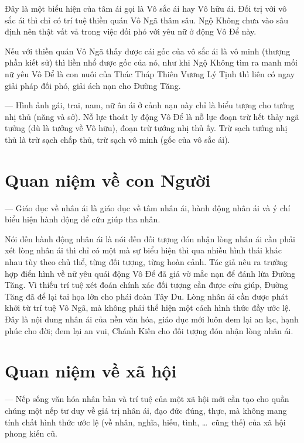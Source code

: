 Đây là một biểu hiện của tâm ái gọi là Vô sắc ái hay Vô hữu ái. Đối trị với vô sắc ái thì chỉ có trí tuệ thiền quán Vô Ngã thâm sâu. Ngộ Không chưa vào sâu định nên thật vất vả trong việc đối phó với yêu nữ ở động Vô Để này.

Nếu với thiền quán Vô Ngã thấy được cái gốc của vô sắc ái là vô minh (thượng phần kiết sử) thì liền nhổ được gốc của nó, như khi Ngộ Không tìm ra manh mối nữ yêu Vô Để là con nuôi của Thác Tháp Thiên Vương Lý Tịnh thì liên có ngay giải pháp đối phó, giải ách nạn cho Đường Tăng.

— Hình ảnh gái, trai, nam, nữ ân ái ở cảnh nạn này chỉ là biểu tượng cho tướng nhị thủ (năng và sở). Nỗ lực thoát ly động Vô Để là nỗ lực đoạn trừ hết thảy ngã tưởng (dù là tưởng về Vô hữu), đoạn trừ tướng nhị thủ ấy. Trừ sạch tướng nhị thủ là trừ sạch chấp thủ, trừ sạch vô minh (gốc của vô sắc ái).

\section{Quan niệm về con Người} %
\label{sec:80_81_con_nguoi}

— Giáo dục về nhân ái là giáo dục về tâm nhân ái, hành động nhân ái và ý chí biểu hiện hành động để cứu giúp tha nhân.

Nói đến hành động nhân ái là nói đến đối tượng đón nhận lòng nhân ái cần phải xét lòng nhân ái thì chỉ có một mà sự biểu hiện thì qua nhiều hình thái khác nhau tùy theo chủ thể, từng đối tượng, từng hoàn cảnh. Tác giả nêu ra trường hợp điển hình về nữ yêu quái động Vô Để đã giả vờ mắc nạn để đánh lừa Đường Tăng. Vì thiếu trí tuệ xét đoán chính xác đối tượng cần được cứu giúp, Đường Tăng đã để lại tai họa lớn cho phái đoàn Tây Du. Lòng nhân ái cần được phát khởi từ trí tuệ Vô Ngã, mà không phải thể hiện một cách hình thức đầy ước lệ. Đây là nội dung nhân ái của nền văn hóa, giáo dục mới luôn đem lại an lạc, hạnh phúc cho đời; đem lại an vui, Chánh Kiến cho đối tượng đón nhận lòng nhân ái.

\section{Quan niệm về xã hội} %
\label{sec:80_81_xa_hoi}

— Nếp sống văn hóa nhân bản và trí tuệ của một xã hội mới cần tạo cho quần chúng một nếp tư duy về giá trị nhân ái, đạo đức đúng, thực, mà không mang tính chất hình thức ước lệ (về nhân, nghĩa, hiếu, tình, \ldots ~cũng thế) của xã hội phong kiến cũ.


